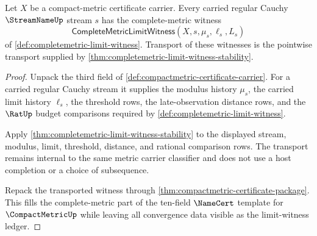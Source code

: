 \begin{theorem}
\label{thm:compactmetric-limit-witness-family-obligation}
Let $X$ be a compact-metric certificate carrier. Every carried regular Cauchy
$\StreamNameUp$ stream $s$ has the complete-metric witness
$$
\mathsf{CompleteMetricLimitWitness}(X,s,\mu_s,\ell_s,L_s)
$$
of \autoref{def:completemetric-limit-witness}. Transport of these witnesses is
the pointwise transport supplied by
\autoref{thm:completemetric-limit-witness-stability}.
\end{theorem}
\begin{proof}
Unpack the third field of \autoref{def:compactmetric-certificate-carrier}. For a
carried regular Cauchy stream it supplies the modulus history $\mu_s$, the
carried limit history $\ell_s$, the threshold rows, the late-observation
distance rows, and the $\RatUp$ budget comparisons required by
\autoref{def:completemetric-limit-witness}.

Apply \autoref{thm:completemetric-limit-witness-stability} to the displayed
stream, modulus, limit, threshold, distance, and rational comparison rows. The
transport remains internal to the same metric carrier classifier and does not
use a host completion or a choice of subsequence.

Repack the transported witness through
\autoref{thm:compactmetric-certificate-package}. This fills the complete-metric
part of the ten-field $\NameCert$ template for $\CompactMetricUp$ while leaving
all convergence data visible as the limit-witness ledger.
\end{proof}

